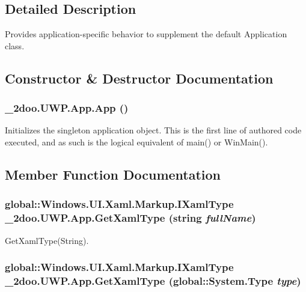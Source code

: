\subsection{Detailed Description}
Provides application-specific behavior to supplement the default Application class. 



\subsection{Constructor \& Destructor Documentation}
\hypertarget{class__2doo_1_1_u_w_p_1_1_app_2c6bd80c4f37f81312b4b71978784204}{
\subsubsection[{App}]{\setlength{\rightskip}{0pt plus 5cm}\_\-2doo.UWP.App.App ()}}
\label{class__2doo_1_1_u_w_p_1_1_app_2c6bd80c4f37f81312b4b71978784204}


Initializes the singleton application object. This is the first line of authored code executed, and as such is the logical equivalent of main() or WinMain(). 



\subsection{Member Function Documentation}
\hypertarget{class__2doo_1_1_u_w_p_1_1_app_645f7fd0ab0344a892c3fb95b6685bff}{
\subsubsection[{GetXamlType}]{\setlength{\rightskip}{0pt plus 5cm}global::Windows.UI.Xaml.Markup.IXamlType \_\-2doo.UWP.App.GetXamlType (string {\em fullName})}}
\label{class__2doo_1_1_u_w_p_1_1_app_645f7fd0ab0344a892c3fb95b6685bff}


GetXamlType(String). 

\hypertarget{class__2doo_1_1_u_w_p_1_1_app_231de22afc574dbcb55d80162d722b10}{
\subsubsection[{GetXamlType}]{\setlength{\rightskip}{0pt plus 5cm}global::Windows.UI.Xaml.Markup.IXamlType \_\-2doo.UWP.App.GetXamlType (global::System.Type {\em type})}}
\label{class__2doo_1_1_u_w_p_1_1_app_231de22afc574dbcb55d80162d722b10}


